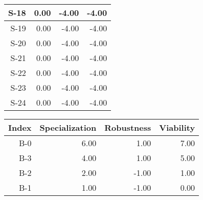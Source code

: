 \begin{tabular}{ | r | r | r | r | }
    \hline
                  S-18  &            0.00  &           -4.00  &           -4.00  \\
    \hline
                  S-19  &            0.00  &           -4.00  &           -4.00  \\
    \hline
                  S-20  &            0.00  &           -4.00  &           -4.00  \\
    \hline
                  S-21  &            0.00  &           -4.00  &           -4.00  \\
    \hline
                  S-22  &            0.00  &           -4.00  &           -4.00  \\
    \hline
                  S-23  &            0.00  &           -4.00  &           -4.00  \\
    \hline
                  S-24  &            0.00  &           -4.00  &           -4.00  \\
    \hline
\end{tabular}


\begin{tabular}{ | r | r | r | r | }
    \hline
                 Index  &  Specialization  &      Robustness  &       Viability  \\
    \hline
    \hline
                   B-0  &            6.00  &            1.00  &            7.00  \\
    \hline
                   B-3  &            4.00  &            1.00  &            5.00  \\
    \hline
                   B-2  &            2.00  &           -1.00  &            1.00  \\
    \hline
                   B-1  &            1.00  &           -1.00  &            0.00  \\
    \hline
\end{tabular}


